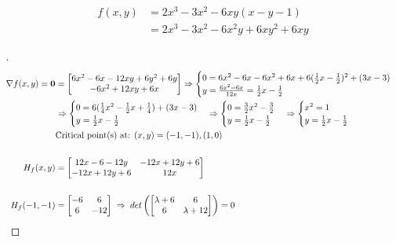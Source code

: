 \documentclass[12pt]{article}
\newenvironment{exercise}[2][Exercise]{\begin{trivlist}
\item[\hskip \labelsep {\bfseries #1}\hskip \labelsep {\bfseries #2.}]}{\end{trivlist}}
\begin{document}
\pagebreak
\begin{exercise}{3}
	\begin{align*}
		f(x,y) &= 2x^3 - 3x^2 - 6xy(x - y - 1) \\
		 &= 2x^3 - 3x^2 - 6x^2y + 6xy^2 + 6xy
	\end{align*}
\end{exercise}
\begin{proof}[]
	\begin{align*}
		\nabla f(x,y) = \bm{0} &= \begin{bmatrix} 6x^2 - 6x - 12xy + 6y^2 + 6y \\ - 6x^2 + 12xy + 6x \end{bmatrix} \Rightarrow
		\begin{cases} 0 = 6x^2 - 6x - 6x^2 + 6x + 6(\frac{1}{2}x - \frac{1}{2})^2 + (3x - 3) \\ y = \frac{6x^2 - 6x}{12x} = \frac{1}{2}x - \frac{1}{2} \end{cases} \\
		& \Rightarrow
		\begin{cases} 0 = 6(\frac{1}{4}x^2 - \frac{1}{2}x + \frac{1}{4}) + (3x - 3) \\ y = \frac{1}{2}x - \frac{1}{2} \end{cases}
		\Rightarrow
		\begin{cases} 0 = \frac{3}{2}x^2 - \frac{3}{2} \\ y = \frac{1}{2}x - \frac{1}{2} \end{cases} 
		\Rightarrow
		\begin{cases} x^2 = 1 \\ y = \frac{1}{2}x - \frac{1}{2} \end{cases} \\
		& \textnormal{Critical point(s) at: } (x,y) = (-1, -1), (1, 0) \\[15pt]
		H_f(x,y) &= \begin{bmatrix} 12x - 6 -12y & -12x + 12y + 6 \\ -12x + 12y + 6 & 12x \end{bmatrix} \\[15pt]
		H_f(-1, -1) &= \begin{bmatrix} -6 & 6 \\ 6 & -12 \end{bmatrix} \; \Rightarrow \; det\left( \begin{bmatrix} \lambda + 6 & 6 \\ 6 & \lambda + 12 \end{bmatrix} \right) = 0 \\

\end{align*}
\end{proof}
\end{document}
